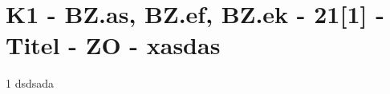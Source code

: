 \section{K1 - BZ.as, BZ.ef, BZ.ek - 21[1] - Titel - ZO - xasdas}

\begin{langesbeispiel}\item[1] %
dsdsada

\end{langesbeispiel}
